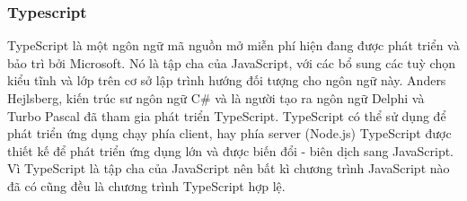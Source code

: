 \documentclass[a4paper,12pt,oneside]{article}
\begin{document}
\subsubsection{Typescript}
\noindent TypeScript là một ngôn ngữ mã nguồn mở miễn phí hiện đang được phát triển và bảo trì bởi Microsoft. Nó là tập cha của JavaScript, với các bổ sung các tuỳ chọn kiểu tĩnh và lớp trên cơ sở lập trình hướng đối tượng cho ngôn ngữ này. Anders Hejlsberg, kiến trúc sư ngôn ngữ C\# và là người tạo ra ngôn ngữ Delphi và Turbo Pascal đã tham gia phát triển TypeScript. TypeScript có thể sử dụng để phát triển ứng dụng chạy phía client, hay phía server (Node.js)  
TypeScript được thiết kế để phát triển ứng dụng lớn và được biến đổi - biên dịch sang JavaScript. Vì TypeScript là tập cha của JavaScript nên bất kì chương trình JavaScript nào đã có cũng đều là chương trình TypeScript hợp lệ.  
\end{document}
